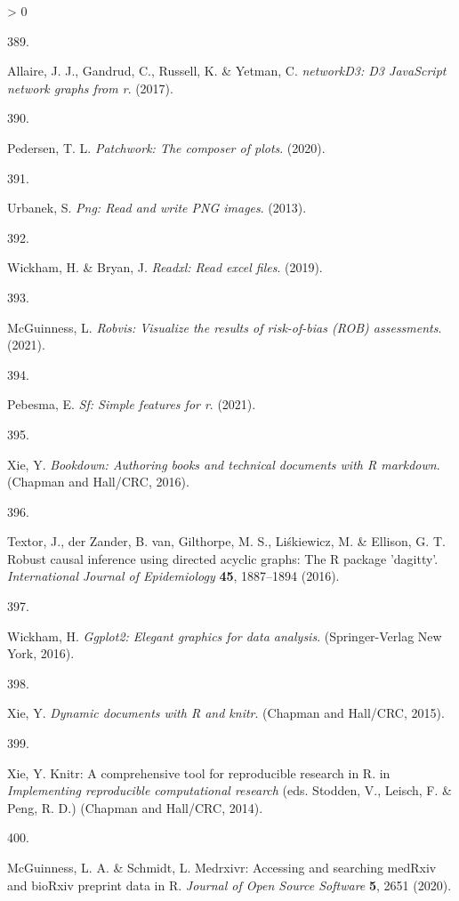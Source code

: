\documentclass[a4paper, twoside]{templates/ociamthesis}
\newlength{\cslhangindent}
\newlength{\csllabelwidth}
\newenvironment{CSLReferences}[3] %
 {%
  \setlength{\parindent}{0pt}
  \ifodd #1 \everypar{\setlength{\hangindent}{\cslhangindent}}\ignorespaces\fi
  \ifnum #2 > 0
  \setlength{\parskip}{#2\baselineskip}
  \fi
 }%
 {}
\newcommand{\CSLLeftMargin}[1]{\parbox[t]{\maxof{\widthof{#1}}{\csllabelwidth}}{#1}}
\newcommand{\CSLRightInline}[1]{\parbox[t]{\linewidth - \csllabelwidth}{#1}}
\begin{document}
\begin{CSLReferences}{0}{0}
\leavevmode\hypertarget{ref-R-networkD3}{}%
\CSLLeftMargin{389. }
\CSLRightInline{Allaire, J. J., Gandrud, C., Russell, K. \& Yetman, C. \emph{{networkD3}: D3 {JavaScript} network graphs from r}. (2017).}

\leavevmode\hypertarget{ref-R-patchwork}{}%
\CSLLeftMargin{390. }
\CSLRightInline{Pedersen, T. L. \emph{Patchwork: The composer of plots}. (2020).}

\leavevmode\hypertarget{ref-R-png}{}%
\CSLLeftMargin{391. }
\CSLRightInline{Urbanek, S. \emph{Png: Read and write {PNG} images}. (2013).}

\leavevmode\hypertarget{ref-R-readxl}{}%
\CSLLeftMargin{392. }
\CSLRightInline{Wickham, H. \& Bryan, J. \emph{Readxl: Read excel files}. (2019).}

\leavevmode\hypertarget{ref-R-robvis}{}%
\CSLLeftMargin{393. }
\CSLRightInline{McGuinness, L. \emph{Robvis: Visualize the results of risk-of-bias ({ROB}) assessments}. (2021).}

\leavevmode\hypertarget{ref-R-sf}{}%
\CSLLeftMargin{394. }
\CSLRightInline{Pebesma, E. \emph{Sf: Simple features for r}. (2021).}

\leavevmode\hypertarget{ref-bookdown2016}{}%
\CSLLeftMargin{395. }
\CSLRightInline{Xie, Y. \emph{Bookdown: Authoring books and technical documents with {R} markdown}. ({Chapman and Hall/CRC}, 2016).}

\leavevmode\hypertarget{ref-dagitty2016}{}%
\CSLLeftMargin{396. }
\CSLRightInline{Textor, J., der Zander, B. van, Gilthorpe, M. S., Liśkiewicz, M. \& Ellison, G. T. Robust causal inference using directed acyclic graphs: The {R} package 'dagitty'. \emph{International Journal of Epidemiology} \textbf{45}, 1887--1894 (2016).}

\leavevmode\hypertarget{ref-ggplot22016}{}%
\CSLLeftMargin{397. }
\CSLRightInline{Wickham, H. \emph{Ggplot2: Elegant graphics for data analysis}. ({Springer-Verlag New York}, 2016).}

\leavevmode\hypertarget{ref-knitr2015}{}%
\CSLLeftMargin{398. }
\CSLRightInline{Xie, Y. \emph{Dynamic documents with {R} and knitr}. ({Chapman and Hall/CRC}, 2015).}

\leavevmode\hypertarget{ref-knitr2014}{}%
\CSLLeftMargin{399. }
\CSLRightInline{Xie, Y. Knitr: A comprehensive tool for reproducible research in {R}. in \emph{Implementing reproducible computational research} (eds. Stodden, V., Leisch, F. \& Peng, R. D.) ({Chapman and Hall/CRC}, 2014).}

\leavevmode\hypertarget{ref-medrxivr2020}{}%
\CSLLeftMargin{400. }
\CSLRightInline{McGuinness, L. A. \& Schmidt, L. Medrxivr: Accessing and searching {medRxiv} and {bioRxiv} preprint data in {R}. \emph{Journal of Open Source Software} \textbf{5}, 2651 (2020).}


\end{CSLReferences}
\end{document}
